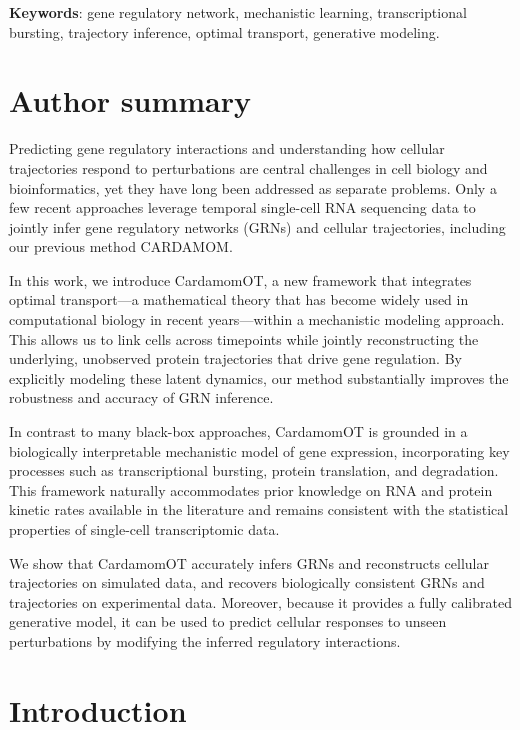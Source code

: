 \documentclass[a4paper, 11pt]{article}
\theoremstyle{plain}
\theoremstyle{remark}
\newcommand*{\firstreview}[1]{{\color{black}#1}}
\begin{document}
\vspace{.5cm}
\noindent \textbf{Keywords}: gene \firstreview{regulatory} network, mechanistic learning, transcriptional bursting, trajectory inference, optimal transport, generative modeling.\par
\newpage

\section*{Author summary}
Predicting gene regulatory interactions and understanding how cellular trajectories respond to perturbations are central challenges in cell biology and bioinformatics, yet they have long been addressed as separate problems. Only a few recent approaches leverage temporal single-cell RNA sequencing data to jointly infer gene regulatory networks (GRNs) and cellular trajectories, including our previous method CARDAMOM.

In this work, we introduce CardamomOT, a new framework that integrates optimal transport—a mathematical theory that has become widely used in computational biology in recent years—within a mechanistic modeling approach. This allows us to link cells across timepoints while jointly reconstructing the underlying, unobserved protein trajectories that drive gene regulation. By explicitly modeling these latent dynamics, our method substantially improves the robustness and accuracy of GRN inference.

In contrast to many black-box approaches, CardamomOT is grounded in a biologically interpretable mechanistic model of gene expression, incorporating key processes such as transcriptional bursting, protein translation, and degradation. This framework naturally accommodates prior knowledge on RNA and protein kinetic rates available in the literature and remains consistent with the statistical properties of single-cell transcriptomic data.

\firstreview{We show that CardamomOT accurately infers GRNs and reconstructs cellular trajectories on simulated data, and recovers biologically consistent GRNs and trajectories on experimental data.}  Moreover, because it provides a fully calibrated generative model, it can be used to predict cellular responses to unseen perturbations by modifying the inferred regulatory interactions.

\section*{Introduction}
\end{document}
